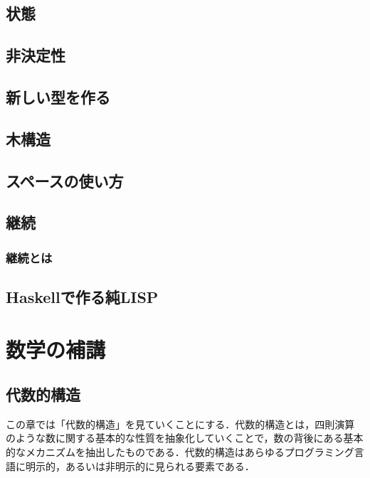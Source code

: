 \documentclass[a4paper]{jsbook}
\newenvironment{leader}{\begingroup}{\endgroup}
\begin{document}
\chapter{状態}

\chapter{非決定性}

\chapter{新しい型を作る}

\chapter{木構造}

\chapter{スペースの使い方}

\chapter{継続}

\section{継続とは}




\chapter{Haskellで作る純LISP}

\part{数学の補講}


\chapter{代数的構造}

\begin{leader}
この章では「代数的構造」を見ていくことにする．代数的構造とは，四則演算のような数に関する基本的な性質を抽象化していくことで，数の背後にある基本的なメカニズムを抽出したものである．代数的構造はあらゆるプログラミング言語に明示的，あるいは非明示的に見られる要素である．
\end{leader}
\end{document}
